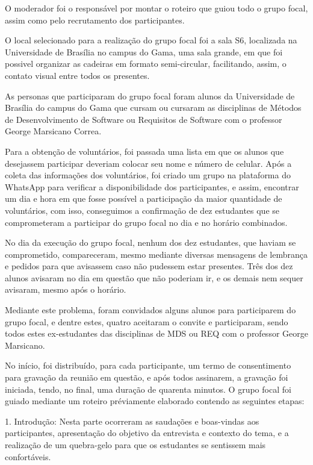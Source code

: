O moderador foi o responsável por montar o roteiro que guiou todo o grupo focal, assim como pelo recrutamento dos participantes.

O local selecionado para a realização do grupo focal foi a sala S6, localizada na Universidade de Brasília no campus do Gama, uma sala grande, em que foi possivel organizar as cadeiras em formato semi-circular, facilitando, assim, o contato visual entre todos os presentes.

As personas que participaram do grupo focal foram alunos da Universidade de Brasília do campus do Gama que cursam ou cursaram as disciplinas de Métodos de Desenvolvimento de Software ou Requisitos de Software com o professor George Marsicano Correa.

Para a obtenção de voluntários, foi passada uma lista em que os alunos que desejassem participar deveriam colocar seu nome e número de celular. Após a coleta das informações dos voluntários, foi criado um grupo na plataforma do WhatsApp para verificar a disponibilidade dos participantes, e assim, encontrar um dia e hora em que fosse possível a participação da maior quantidade de voluntários, com isso, conseguimos a confirmação de dez estudantes que se comprometeram a participar do grupo focal no dia e no horário combinados.

No dia da execução do grupo focal, nenhum dos dez estudantes, que haviam se comprometido, compareceram, mesmo mediante diversas mensagens de lembrança e pedidos para que avisassem caso não pudessem estar presentes. Três dos dez alunos avisaram no dia em questão que não poderiam ir, e os demais nem sequer avisaram, mesmo após o horário.

Mediante este problema, foram convidados alguns alunos para participarem do grupo focal, e dentre estes, quatro aceitaram o convite e participaram, sendo todos estes ex-estudantes das disciplinas de MDS ou REQ com o professor George Marsicano.

No início, foi distribuído, para cada participante, um termo de consentimento para gravação da reunião em questão, e após todos assinarem, a gravação foi iniciada, tendo, no final, uma duração de quarenta minutos. O grupo focal foi guiado mediante um roteiro préviamente elaborado contendo as seguintes etapas:

1. Introdução: Nesta parte ocorreram as saudações e boas-vindas aos participantes, apresentação do objetivo da entrevista e contexto do tema, e a realização de um quebra-gelo para que os estudantes se sentissem mais confortáveis.

